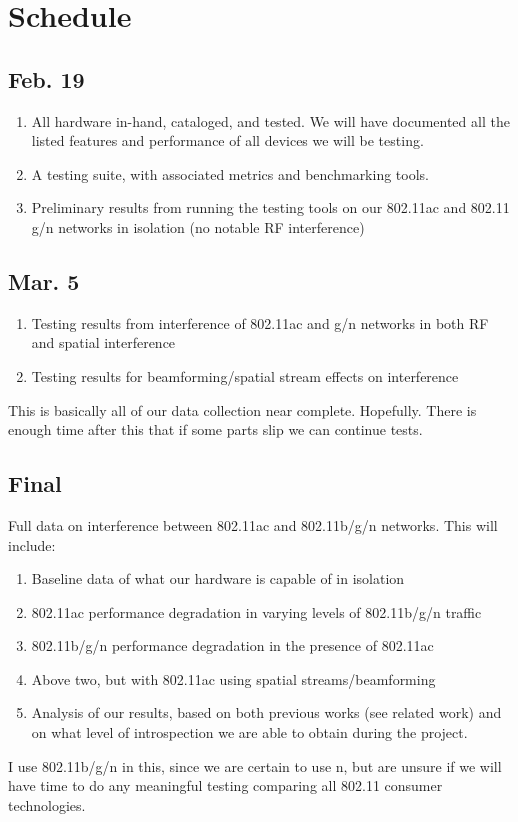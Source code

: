 \section{Schedule}


\subsection{Feb. 19}
\begin{enumerate}
\item All hardware in-hand, cataloged, and tested. We will have documented all the listed features and performance of all devices we will be testing.
\item A testing suite, with associated metrics and benchmarking tools.
\item Preliminary results from running the testing tools on our 802.11ac and 802.11 g/n networks in isolation (no notable RF interference)
\end{enumerate}

\subsection{Mar. 5}
\begin{enumerate}
\item Testing results from interference of 802.11ac and g/n networks in both RF and spatial interference
\item Testing results for beamforming/spatial stream effects on interference
\end{enumerate}
This is basically all of our data collection near
complete. Hopefully. There is enough time after this that if some
parts slip we can continue tests.

\subsection{Final}
Full data on interference between 802.11ac and 802.11b/g/n networks. This will include:
\begin{enumerate}
\item Baseline data of what our hardware is capable of in isolation
\item 802.11ac performance degradation in varying levels of 802.11b/g/n traffic
\item 802.11b/g/n performance degradation in the presence of 802.11ac
\item Above two, but with 802.11ac using spatial streams/beamforming
\item Analysis of our results, based on both previous works (see
  related work) and on what level of introspection we are able to
  obtain during the project.
\end{enumerate}

I use 802.11b/g/n in this, since we are certain to use n, but are
unsure if we will have time to do any meaningful testing comparing all
802.11 consumer technologies.
